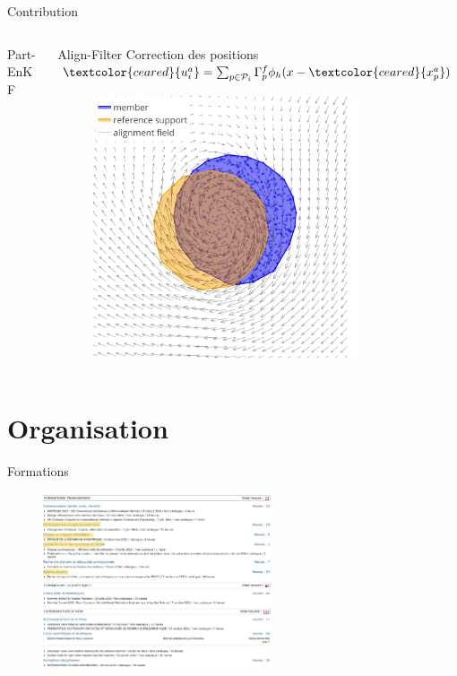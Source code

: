 \documentclass[aspectratio=169]{beamer} %
\begin{document}
\begin{frame}{Contribution}
\begin{columns}[t]
\begin{column}{0.33\textwidth}
\begin{block}{Part-EnKF}
\begin{figure}
                \end{figure}
            \end{block}
        \end{column}
        \begin{column}{0.33\textwidth}
            \begin{block}{Align-Filter}
                Correction des positions
                $\textcolor{ceared}{u^a_i} = \sum_{p \in \mathcal P_i} \Gamma^f_p \phi_h(x - \textcolor{ceared}{x_p^a})$
                \begin{figure}
                    \centering
                    \includegraphics[width=0.8\textwidth]{../../conference/images/align_member_1.pdf}
                \end{figure}
            \end{block}
        \end{column}
    \end{columns}
\end{frame}

\section{Organisation}
\begin{frame}{Formations}
    \begin{figure}
        \includegraphics[width=0.6\textwidth]{image/formations_annot.png}
    \end{figure}
\end{frame}
\end{document}
